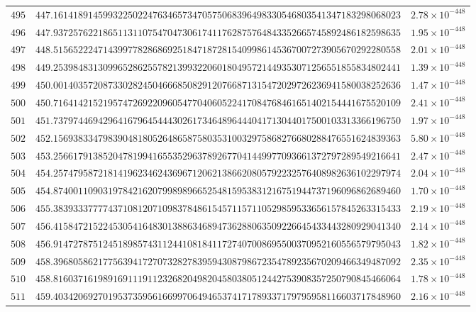 \documentclass[12pt,reqno]{amsart}
\theoremstyle{remark}
\begin{document}
\begin{longtable}{clc}
$495$ & $447.1614189145993225022476346573470575068396498330546803541347183298068023$ & $2.78\times 10^{-448}$ \\
$496$ & $447.9372576221865113110754704730617411762875764843352665745892486182598635$ & $1.95\times 10^{-448}$ \\
$497$ & $448.5156522247143997782868692518471872815409986145367007273905670292280558$ & $2.01\times 10^{-448}$ \\
$498$ & $449.2539848313099652862557821399322060180495721449353071256551855834802441$ & $1.39\times 10^{-448}$ \\
$499$ & $450.0014035720873302824504666850829120766871315472029726236941580038252636$ & $1.47\times 10^{-448}$ \\
$500$ & $450.7164142152195747269220960547704060522417084768461651402154441675520109$ & $2.41\times 10^{-448}$ \\
$501$ & $451.7379744694296416796454443026173464896444041713044017500103313366196750$ & $1.97\times 10^{-448}$ \\
$502$ & $452.1569383347983904818052648658758035310032975868276680288476551624839363$ & $5.80\times 10^{-448}$ \\
$503$ & $453.2566179138520478199416553529637892677041449977093661372797289549216641$ & $2.47\times 10^{-448}$ \\
$504$ & $454.2574795872181419623462436967120621386620805792232576408982636102297974$ & $2.04\times 10^{-448}$ \\
$505$ & $454.8740011090319784216207998989665254815953831216751944737196096862689460$ & $1.70\times 10^{-448}$ \\
$506$ & $455.3839333777743710812071098378486154571157110529859533656157845263315433$ & $2.19\times 10^{-448}$ \\
$507$ & $456.4158472152245305416483013886346894736288063509226645433443280929041340$ & $2.14\times 10^{-448}$ \\
$508$ & $456.9147278751245189857431124410818411727407008695500370952160556579795043$ & $1.82\times 10^{-448}$ \\
$509$ & $458.3968058621775639417270732827839594308798672354789235670209466349487092$ & $2.35\times 10^{-448}$ \\
$510$ & $458.8160371619891691119112326820498204580380512442753908357250790845466064$ & $1.78\times 10^{-448}$ \\
$511$ & $459.4034206927019537359561669970649465374171789337179795958116603717848960$ & $2.16\times 10^{-448}$ \\

\end{longtable}
\end{document}

